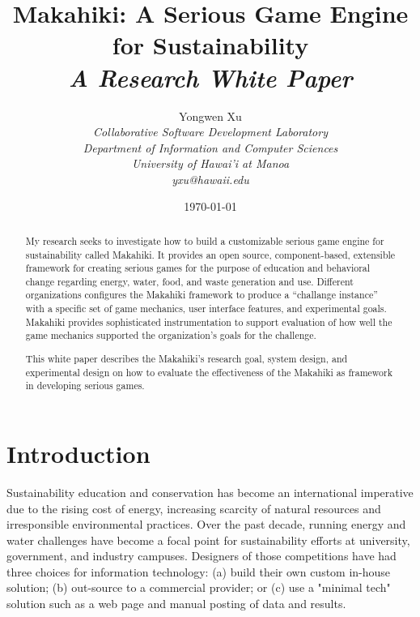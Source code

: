 \documentclass[11pt]{article}
\begin{document}
\title{Makahiki: A Serious Game Engine for Sustainability \\
\em  A Research White Paper}

\author{
	 Yongwen Xu \\
\em  Collaborative Software Development Laboratory \\
\em  Department of Information and Computer Sciences \\
\em  University of Hawai'i at Manoa\\
     yxu@hawaii.edu \\
}

\date{\today}
\maketitle

\tableofcontents

\graphicspath{{figures/}} 

\newpage
\begin{abstract}

My research seeks to investigate how to build a customizable serious game engine for sustainability called Makahiki. It provides an open source, component-based, extensible framework for creating serious games for the purpose of education and behavioral change regarding energy, water, food, and waste generation and use. Different organizations configures the Makahiki framework to produce a ``challange instance'' with a specific set of game mechanics, user interface features, and experimental goals. Makahiki provides sophisticated instrumentation to support evaluation of how well the game mechanics supported the organization's goals for the challenge.

This white paper describes the Makahiki's research goal, system design, and experimental design on how to evaluate the effectiveness of the Makahiki as framework in developing serious games.
\end{abstract}


\section{Introduction}

Sustainability education and conservation has become an international imperative due to the rising cost of energy, increasing scarcity of natural resources and irresponsible environmental practices. 
Over the past decade, running energy and water challenges have become a focal point for sustainability efforts at university, government, and industry campuses. Designers of those competitions have had three choices for information technology: (a) build their own custom in-house solution; (b) out-source to a commercial provider; or (c) use a "minimal tech" solution such as a web page and manual posting of data and results.
\end{document}
